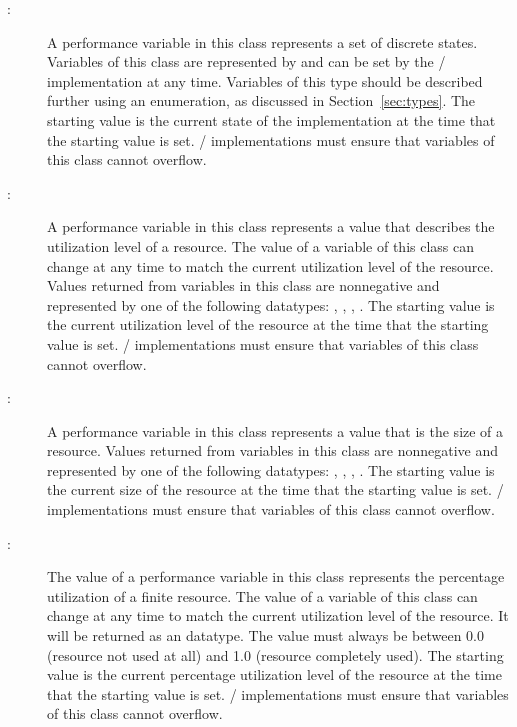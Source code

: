 \begin{sloppy}

\begin{description}

\item[:]A performance variable in this
  class represents a set of discrete states.  Variables of this class are
  represented by  and can be set by the \MPI/
  implementation at any time.  Variables of this type should be described
  further using an enumeration, as discussed in Section~\ref{sec:types}.
  The starting value is the current state of the implementation at the time
  that the starting value is set.  \MPI/ implementations must ensure that
  variables of this class cannot overflow.

\item[:]A performance variable in this
  class represents a value that describes the utilization level of a
  resource.  The value of a variable of this class can change at any time
  to match the current utilization level of the resource.  Values returned
  from variables in this class are nonnegative and represented by one of
  the following datatypes: ,
  , ,
  .  The starting value is the current utilization level
  of the resource at the time that the starting value is set.  \MPI/
  implementations must ensure that variables of this class cannot overflow.

\item[:]A performance variable in this
  class represents a value that is the size of a resource.  Values returned
  from variables in this class are nonnegative and represented by one of
  the following datatypes: ,
  , ,
  .  The starting value is the current size of the
  resource at the time that the starting value is set.  \MPI/
  implementations must ensure that variables of this class cannot overflow.

\item[:]The value of a performance
  variable in this class represents the percentage utilization of a finite
  resource.  The value of a variable of this class can change at any time
  to match the current utilization level of the resource.  It will be
  returned as an  datatype.  The value must always be
  between 0.0 (resource not used at all) and 1.0 (resource completely
  used).  The starting value is the current percentage utilization level of
  the resource at the time that the starting value is set.  \MPI/
  implementations must ensure that variables of this class cannot overflow.


\end{description}
\end{sloppy}
